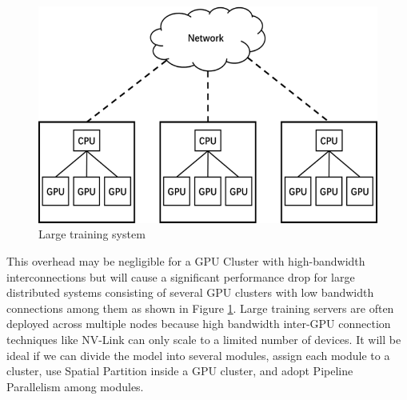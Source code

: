 \documentclass[sigplan, nonacm]{acmart}\settopmatter{printfolios=true,printccs=false,printacmref=false}
\begin{document}
 \begin{figure}[htbp]
  \centering
  \includegraphics[scale=0.7]{networktopo.png}
  \caption{Large training system}
  \label{fig:networktopo}
\end{figure} This overhead may be negligible for a GPU Cluster with high-bandwidth interconnections but will cause a significant performance drop for large distributed systems consisting of several GPU clusters with low bandwidth connections among them as shown in Figure \ref{fig:networktopo}. Large training servers are often deployed across multiple nodes because high bandwidth inter-GPU connection techniques like NV-Link can only scale to a limited number of devices. It will be ideal if we can divide the model into several modules, assign each module to a cluster, use Spatial Partition inside a GPU cluster, and adopt Pipeline Parallelism among modules.\par
\end{document}
